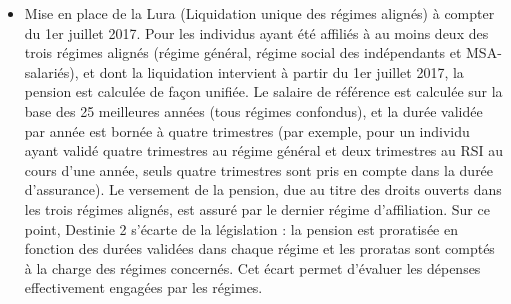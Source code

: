 \begin{itemize}
   \item Mise en place de la Lura (Liquidation unique des régimes alignés) à compter du 1er juillet 2017. Pour les individus ayant été affiliés à au moins deux des trois régimes alignés (régime général, régime social des indépendants et MSA-salariés), et dont la liquidation intervient à partir du 1er juillet 2017, la pension est calculée de façon unifiée. Le salaire de référence est calculée sur la base des 25 meilleures années (tous régimes confondus), et la durée validée par année est bornée à quatre trimestres (par exemple, pour un individu ayant validé quatre trimestres au régime général et deux trimestres au RSI au cours d'une année, seuls quatre trimestres sont pris en compte dans la durée d'assurance). Le versement de la pension, due au titre des droits ouverts dans les trois régimes alignés, est assuré par le dernier régime d’affiliation. Sur ce point, Destinie 2 s'écarte de la législation : la pension est proratisée en fonction des durées validées dans chaque régime et les proratas sont comptés à la charge des régimes concernés. Cet écart permet d'évaluer les dépenses effectivement engagées par les régimes.
\end{itemize}

